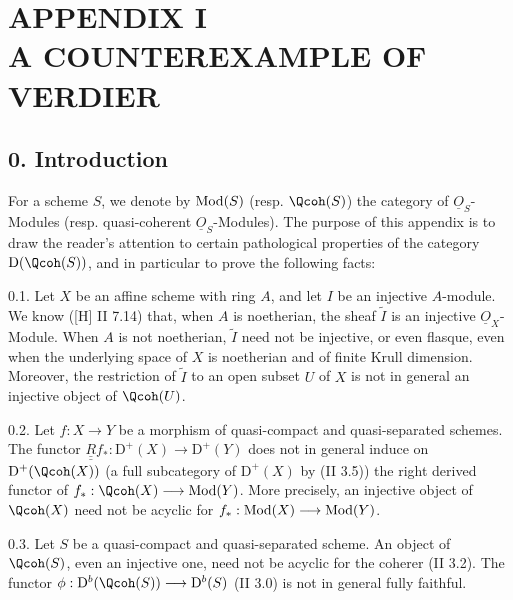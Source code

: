 %
\section*{APPENDIX I\\[3pt] A COUNTEREXAMPLE OF VERDIER\protect{}}

\subsection*{0. Introduction}
For a scheme $S$, we denote by $\operatorname{Mod}(S)$ (resp. $\Qcoh(S)$) the category of $\underline{O}_S$-Modules (resp. quasi-coherent $\underline{O}_S$-Modules). The purpose of this appendix is to draw the reader's attention to certain pathological properties of the category $\mathrm D(\Qcoh(S))$, and in particular to prove the following facts:

0.1. Let $X$ be an affine scheme with ring $A$, and let $I$ be an injective $A$-module. We know ([H] II 7.14) that, when $A$ is noetherian, the sheaf $\widetilde I$ is an injective $\underline{O}_X$-Module. When $A$ is not noetherian, $\widetilde I$ need not be injective, or even flasque, even when the underlying space of $X$ is noetherian and of finite Krull dimension. Moreover, the restriction of $\widetilde I$ to an open subset $U$ of $X$ is not in general an injective object of $\Qcoh(U)$.

0.2. Let $f:X\longrightarrow Y$ be a morphism of quasi-compact and quasi-separated schemes. The functor $\underline{\underline{R}}f_*:\mathrm D^+(X)\longrightarrow\mathrm D^+(Y)$ does not in general induce on $\mathrm D^+(\Qcoh(X))$ (a full subcategory of $\mathrm D^+(X)$ by (II 3.5)) the right derived functor of $f_*:\Qcoh(X)\longrightarrow\Mod(Y)$. More precisely, an injective object of $\Qcoh(X)$ need not be acyclic for $f_*:\operatorname{Mod}(X)\longrightarrow\operatorname{Mod}(Y)$.

0.3. Let $S$ be a quasi-compact and quasi-separated scheme. An object of $\Qcoh(S)$, even an injective one, need not be acyclic for the coherer (II 3.2). The functor $\phi:\mathrm D^b(\Qcoh(S))\longrightarrow\mathrm D^b(S)$ (II 3.0) is not in general fully faithful.


